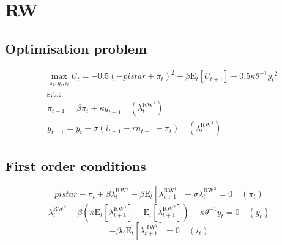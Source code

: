 

\section{RW}

\subsection{Optimisation problem}

\begin{align}
&\max_{\pi_{t}, y_{t}, i_{t}
} U_{t} = -0.5\left(-{p\!i\!s\!t\!a\!r} + \pi_{t}\right)^{2} + {\beta} {\mathrm{E}_{t}\left[U_{t+1}\right]} - 0.5{\kappa} {\theta}^{-1} {y_{t}}^{2}\\
&\mathrm{s.t.:}\nonumber\\
& \pi_{t-1} = {\beta} {\pi_{t}} + {\kappa} {y_{t-1}} \quad \left(\lambda^{\mathrm{RW}^{\mathrm{1}}}_{t}\right)\\
& y_{t-1} = y_{t} - {\sigma} \left(i_{t-1} - {r\!n}_{t-1} - \pi_{t}\right) \quad \left(\lambda^{\mathrm{RW}^{\mathrm{2}}}_{t}\right)
\end{align}


\subsection{First order conditions}

\begin{equation}
{p\!i\!s\!t\!a\!r} - \pi_{t} + {\beta} {\lambda^{\mathrm{RW}^{\mathrm{1}}}_{t}} - {\beta} {\mathrm{E}_{t}\left[\lambda^{\mathrm{RW}^{\mathrm{1}}}_{t+1}\right]} + {\sigma} {\lambda^{\mathrm{RW}^{\mathrm{2}}}_{t}} = 0
 \quad \left(\pi_{t}\right)
\end{equation}
\begin{equation}
\lambda^{\mathrm{RW}^{\mathrm{2}}}_{t} + {\beta} \left({\kappa} {\mathrm{E}_{t}\left[\lambda^{\mathrm{RW}^{\mathrm{1}}}_{t+1}\right]} - \mathrm{E}_{t}\left[\lambda^{\mathrm{RW}^{\mathrm{2}}}_{t+1}\right]\right) - {\kappa} {\theta}^{-1} {y_{t}} = 0
 \quad \left(y_{t}\right)
\end{equation}
\begin{equation}
-{\beta} {\sigma} {\mathrm{E}_{t}\left[\lambda^{\mathrm{RW}^{\mathrm{2}}}_{t+1}\right]} = 0
 \quad \left(i_{t}\right)
\end{equation}




